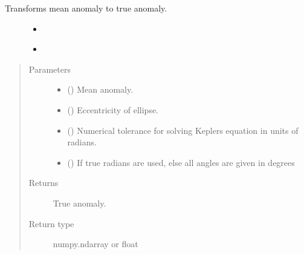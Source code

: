 \documentclass[letterpaper,10pt,english]{sphinxmanual}
\begin{document}
\begin{fulllineitems}
\label{\detokenize{modules/dpt_tools:dpt_tools.mean2true}}
Transforms mean anomaly to true anomaly.
\begin{description}
\item[{}] \leavevmode\begin{itemize}
\item {} 
{\hyperref[\detokenize{modules/dpt_tools:dpt_tools.mean2eccentric}]{}}

\item {} 
{\hyperref[\detokenize{modules/dpt_tools:dpt_tools.eccentric2true}]{}}

\end{itemize}

\end{description}
\begin{quote}\begin{description}
\item[{Parameters}] \leavevmode\begin{itemize}
\item {} 
 () \textendash{} Mean anomaly.

\item {} 
 () \textendash{} Eccentricity of ellipse.

\item {} 
 () \textendash{} Numerical tolerance for solving Keplers equation in units of radians.

\item {} 
 () \textendash{} If true radians are used, else all angles are given in degrees

\end{itemize}

\item[{Returns}] \leavevmode
True anomaly.

\item[{Return type}] \leavevmode
numpy.ndarray or float

\end{description}\end{quote}

\end{fulllineitems}
\end{document}
